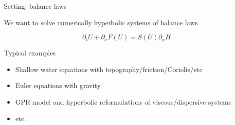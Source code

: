 
\begin{frame}[t]{Setting: balance laws}
\MyLogoa

\vspace{0.5cm}

We want to solve numerically  hyperbolic systems of balance laws

\begin{equation}
	\partial_tU+ \partial_x F(U)=  S(U)\partial_xH \nonumber
\end{equation}
 
\vspace{1.cm}

Typical examples  


\begin{itemize}
\item Shallow water equations with topography/friction/Coriolis/etc
\item  Euler equations with gravity
\item GPR model and hyperbolic reformulations of viscous/dispersive  systems 
\item  etc. 
\end{itemize}


\end{frame}
 

